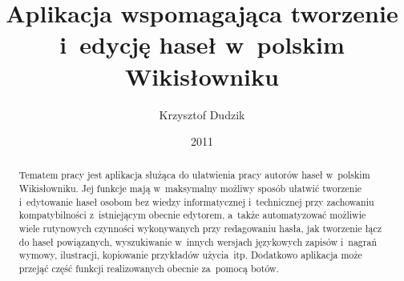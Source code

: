 \documentclass{pracamgr}
\author{Krzysztof Dudzik}
\title{Aplikacja wspomagająca tworzenie i~edycję haseł w~polskim Wikisłowniku}
\date{2011}
\begin{document}
\maketitle

\begin{abstract}
  Tematem pracy jest aplikacja służąca do ułatwienia pracy autorów haseł w~polskim Wikisłowniku. Jej funkcje mają w~maksymalny możliwy sposób ułatwić tworzenie i~edytowanie haseł osobom bez wiedzy informatycznej i~technicznej przy zachowaniu kompatybilności z~istniejącym obecnie edytorem, a~także automatyzować możliwie wiele rutynowych czynności wykonywanych przy redagowaniu hasła, jak tworzenie łącz do haseł powiązanych, wyszukiwanie w~innych wersjach językowych zapisów i~nagrań wymowy, ilustracji, kopiowanie przykładów użycia~itp. Dodatkowo aplikacja może przejąć część funkcji realizowanych obecnie za~pomocą botów.
\end{abstract}

\tableofcontents
\end{document}
